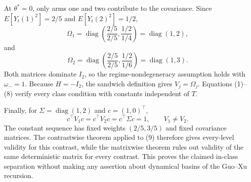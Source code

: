 At \(\theta^*=0\), only arms one and two contribute to the covariance. Since \(E[Y_t(1)^2]=2/5\) and \(E[Y_t(2)^2]=1/2\),
\[
 \Omega_1
 =\operatorname{diag}\left(\frac{2/5}{2/5},\frac{1/2}{1/4}\right)
 =\operatorname{diag}(1,2), \tag{7}
\]
and
\[
 \Omega_2
 =\operatorname{diag}\left(\frac{2/5}{2/5},\frac{1/2}{1/6}\right)
 =\operatorname{diag}(1,3). \tag{8}
\]
Both matrices dominate \(I_2\), so the regime-nondegeneracy assumption holds with \(\omega_-=1\). Because \(H=-I_2\), the sandwich definition gives \(V_j=\Omega_j\). Equations (1)--(8) verify every class condition with constants independent of \(T\).

Finally, for \(\Sigma=\operatorname{diag}(1,2)\) and \(c=(1,0)^\top\),
\[
 c^\top V_1c=c^\top V_2c=c^\top\Sigma c=1,
 \qquad V_1\ne V_2. \tag{9}
\]
The constant sequence has fixed weights \((2/5,3/5)\) and fixed covariance matrices. The contrastwise theorem applied to (9) therefore gives every-level validity for this contrast, while the matrixwise theorem rules out validity of the same deterministic matrix for every contrast. This proves the claimed in-class separation without making any assertion about dynamical basins of the Guo--Xu recursion.
